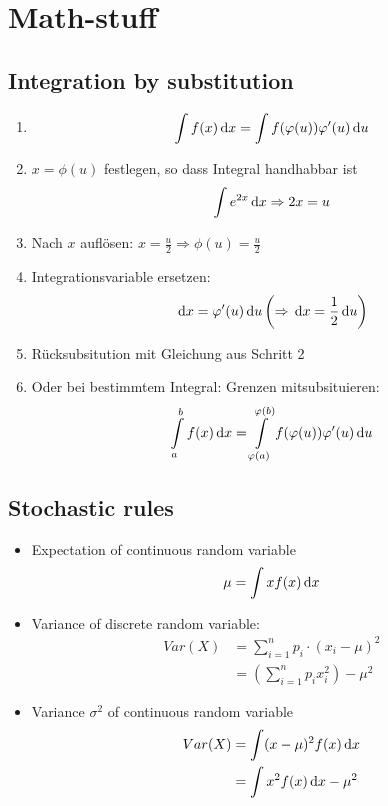 
\section{Math-stuff}
\subsection{Integration by substitution}
\begin{enumerate}
	\item
		\begin{align*}
			\intop f(x) \id x = \intop f(\phi(u)) \phi'(u) \id u
		\end{align*}
	\item
		$x = \phi(u)$ festlegen, so dass Integral handhabbar ist
		\begin{align*}
			\intop e^{2x} \id x \Rightarrow 2x = u
		\end{align*}
	\item
		Nach $x$ auflösen: $x = \frac{u}2 \Rightarrow \phi(u) = \frac{u}2$
	\item
		Integrationsvariable ersetzen:
		\begin{align*}
		\, \mathrm{d} x = \varphi'(u) \, \mathrm{d} u \left(\Rightarrow \, \mathrm{d} x = \frac12 \, \mathrm{d} u \right)
		\end{align*}
	\item
		Rücksubsitution mit Gleichung aus Schritt 2
	\item
		Oder bei bestimmtem Integral: Grenzen mitsubsituieren:
		\begin{align*}
			\intop_a^b f(x) \id x = \intop_{\phi(a)}^{\phi(b)} f(\phi(u)) \phi'(u) \id u
		\end{align*}

\end{enumerate}

\subsection{Stochastic rules}
\begin{itemize}
	\item
		Expectation of continuous random variable
		\begin{align*}
			\mu = \int x f(x) \, \mathrm{d} x
		\end{align*}
	\item
		Variance of discrete random variable:
		\begin{align*}
			Var(X) &= \sum_{i=1}^n p_i \cdot (x_i - \mu)^2\\
						 &= \left(\sum_{i=1}^np_ix_i^2\right) - \mu^2
		\end{align*}
	\item
		Variance $\sigma^2$ of continuous random variable
		\begin{align*}
			Var(X) &= \int (x - \mu)^2f(x) \, \mathrm{d} x\\
						 &= \int x^2 f(x) \, \mathrm{d} x - \mu^2
		\end{align*}
\end{itemize}

